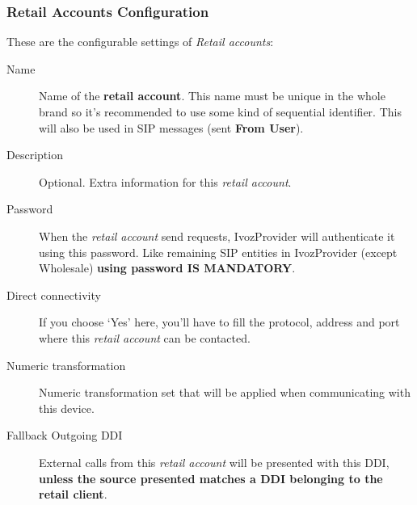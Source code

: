 \documentclass[letterpaper,10pt,english]{sphinxmanual}
\begin{document}
\subsubsection{Retail Accounts Configuration}
\label{administration_portal/client/retail/retail_accounts:retail-accounts-configuration}
These are the configurable settings of \emph{Retail accounts}:
\begin{description}
\item[{Name}] \leavevmode{}\label{administration_portal/client/retail/retail_accounts:term-name}
Name of the \textbf{retail account}. This name must be unique in the whole brand so
it's recommended to use some kind of sequential identifier. This will also be used
in SIP messages (sent \textbf{From User}).

\item[{Description}] \leavevmode{}\label{administration_portal/client/retail/retail_accounts:term-description}
Optional. Extra information for this \emph{retail account}.

\item[{Password}] \leavevmode{}\label{administration_portal/client/retail/retail_accounts:term-password}
When the \emph{retail account} send requests, IvozProvider will authenticate it using
this password. Like remaining SIP entities in IvozProvider (except Wholesale) \textbf{using password IS MANDATORY}.

\item[{Direct connectivity}] \leavevmode{}\label{administration_portal/client/retail/retail_accounts:term-direct-connectivity}
If you choose `Yes' here, you'll have to fill the protocol, address and
port where this \emph{retail account} can be contacted.

\item[{Numeric transformation}] \leavevmode{}\label{administration_portal/client/retail/retail_accounts:term-numeric-transformation}
Numeric transformation set that will be applied when communicating with this device.

\item[{Fallback Outgoing DDI}] \leavevmode{}\label{administration_portal/client/retail/retail_accounts:term-fallback-outgoing-ddi}
External calls from this \emph{retail account} will be presented with this DDI, \textbf{unless
the source presented matches a DDI belonging to the retail client}.


\end{description}
\end{document}
